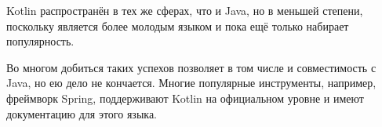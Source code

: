 Kotlin распространён в тех же сферах, что и Java, но в меньшей степени, поскольку является более молодым языком и пока ещё только набирает популярность.

Во многом добиться таких успехов позволяет в том числе и совместимость с Java, но ею дело не кончается. Многие популярные инструменты, например, фреймворк Spring\cite{SPRING_KOTLIN}, поддерживают Kotlin на официальном уровне и имеют документацию для этого языка.